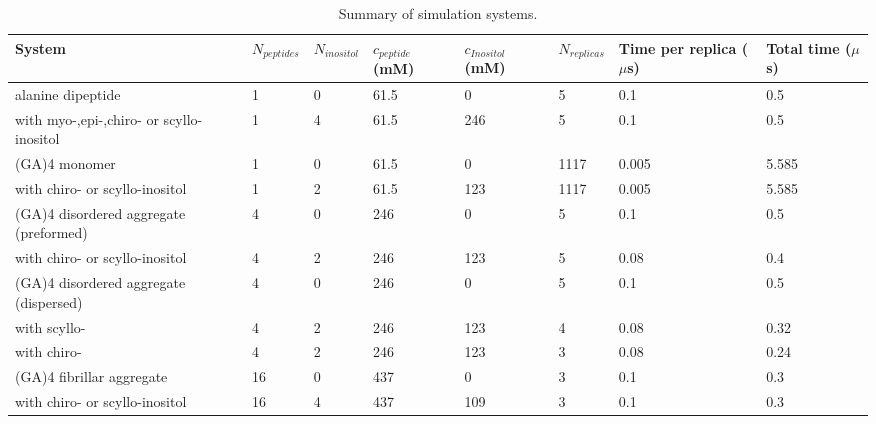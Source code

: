   \begin{table}\footnotesize
    \begin{center}
    \vspace{10pt}
    \label{tab:simulations}
      \begin{tabular}{| p{2.5cm} | *{7}{p{1.25cm}|}}
        \hline
        System & $N_{peptides}$ & $N_{inositol}$ & $c_{peptide}$ (mM) & $c_{Inositol}$ (mM) & $N_{replicas}$ & Time per replica ($\mu$s) & Total time ($\mu$s) \\
        \hline
        \hline
        alanine dipeptide & 1 & 0 & 61.5 & 0 & 5 & 0.1 & 0.5\\
        with myo-,epi-,chiro- or scyllo-inositol & 1 & 4 & 61.5 & 246 & 5 & 0.1 & 0.5 \\
        \hline
        (GA)4 monomer & 1 & 0 & 61.5 & 0 & 1117 & 0.005 & 5.585 \\
        with chiro- or scyllo-inositol & 1 & 2 & 61.5 & 123 & 1117 & 0.005 & 5.585 \\
        \hline
        (GA)4 disordered aggregate (preformed) & 4 & 0 & 246 & 0 & 5 & 0.1 & 0.5 \\
        with chiro- or scyllo-inositol & 4 & 2 & 246 & 123 & 5 & 0.08 & 0.4 \\
        \hline
        (GA)4 disordered aggregate (dispersed) & 4 & 0 & 246 & 0 & 5 & 0.1 & 0.5 \\
        with scyllo- & 4 & 2 & 246 & 123 & 4 & 0.08 & 0.32 \\
        with chiro- & 4 & 2 & 246 & 123 & 3 & 0.08 & 0.24 \\
        \hline
        (GA)4 fibrillar aggregate & 16 & 0 & 437 & 0 & 3 & 0.1 & 0.3 \\
        with chiro- or scyllo-inositol & 16 & 4 & 437 & 109 & 3 & 0.1 & 0.3 \\
        \hline
      \end{tabular}
      \caption{Summary of simulation systems.}
    \end{center}
  \end{table}

